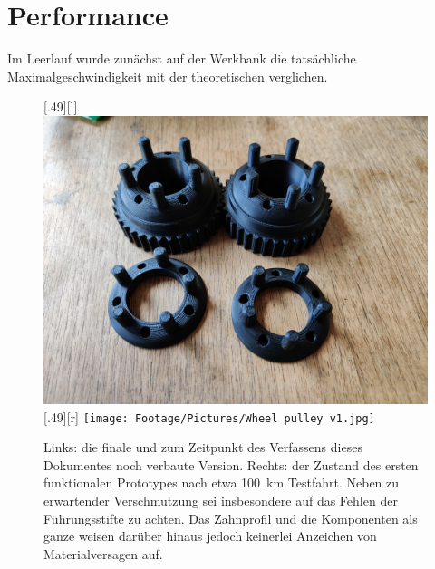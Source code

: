 	\section{Performance}
		Im Leerlauf wurde zunächst auf der Werkbank die tatsächliche Maximalgeschwindigkeit mit der theoretischen verglichen.

	\begin{figure}[h]
		\centering
		[.49\textwidth][l]{
			\includegraphics[angle=180, width=.49\textwidth]{Footage/Pictures/Wheel pulley v2.jpg}
		}
		[.49\textwidth][r]{
			\texttt{[image: Footage/Pictures/Wheel pulley v1.jpg]}
		}
		\caption[Vergleich der gedruckten Zahn- und Konterscheiben vor und nach mehreren Testfahrten]{Links: die finale und zum Zeitpunkt des Verfassens dieses Dokumentes noch verbaute Version. Rechts: der Zustand des ersten funktionalen Prototypes nach etwa \qty{100}{\kilo\metre} Testfahrt. Neben zu erwartender Verschmutzung sei insbesondere auf das Fehlen der Führungsstifte zu achten. Das Zahnprofil und die Komponenten als ganze weisen darüber hinaus jedoch keinerlei Anzeichen von Materialversagen auf.}
		\label{fig:comparison printed parts used unused}
	\end{figure}